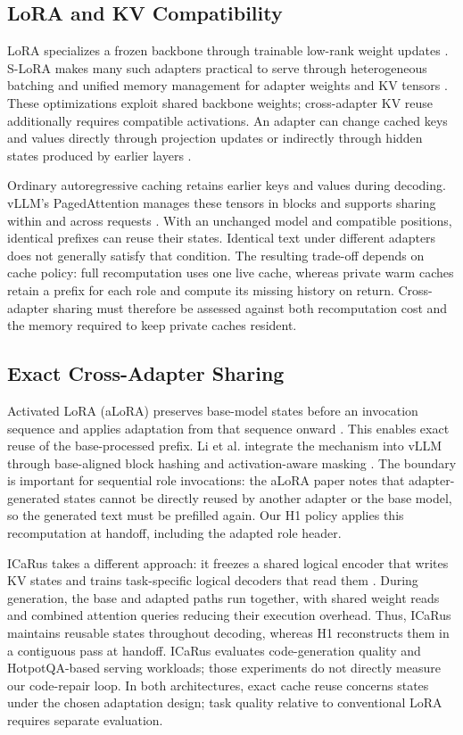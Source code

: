 \documentclass[10pt,twocolumn,letterpaper]{article}
\begin{document}
\subsection{LoRA and KV Compatibility}
LoRA specializes a frozen backbone through trainable low-rank weight updates
\cite{hu2022lora}. S-LoRA makes many such adapters practical to serve through
heterogeneous batching and unified memory management for adapter weights and
KV tensors \cite{sheng2024slora}. These optimizations exploit shared backbone
weights; cross-adapter KV reuse additionally requires compatible activations.
An adapter can change cached keys and values directly through projection
updates or indirectly through hidden states produced by earlier layers
\cite{greenewald2025alora}.

Ordinary autoregressive caching retains earlier keys and values during
decoding. vLLM's PagedAttention manages these tensors in blocks and supports
sharing within and across requests \cite{kwon2023pagedattention}. With an
unchanged model and compatible positions, identical prefixes can reuse their
states. Identical text under different adapters does not generally satisfy
that condition. The resulting trade-off depends on cache policy: full
recomputation uses one live cache, whereas private warm caches retain a prefix
for each role and compute its missing history on return. Cross-adapter sharing
must therefore be assessed against both recomputation cost and the memory
required to keep private caches resident.

\subsection{Exact Cross-Adapter Sharing}
Activated LoRA (aLoRA) preserves base-model states before an invocation
sequence and applies adaptation from that sequence onward
\cite{greenewald2025alora}. This enables exact reuse of the base-processed
prefix. Li et al. integrate the mechanism into vLLM through base-aligned block
hashing and activation-aware masking \cite{li2025aloraserving}. The boundary
is important for sequential role invocations: the aLoRA paper notes that
adapter-generated states cannot be directly reused by another adapter or the
base model, so the generated text must be prefilled again. Our H1 policy
applies this recomputation at handoff, including the adapted role header.

ICaRus takes a different approach: it freezes a shared logical encoder that
writes KV states and trains task-specific logical decoders that read them
\cite{woo2026icarus}. During generation, the base and adapted paths run
together, with shared weight reads and combined attention queries reducing
their execution overhead. Thus, ICaRus maintains reusable states throughout
decoding, whereas H1 reconstructs them in a contiguous pass at handoff.
ICaRus evaluates code-generation quality and HotpotQA-based serving workloads;
those experiments do not directly measure our code-repair loop. In both
architectures, exact cache reuse concerns states under the chosen adaptation
design; task quality relative to conventional LoRA requires separate evaluation.
\end{document}
